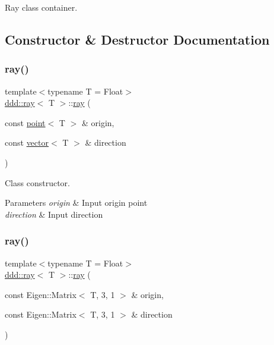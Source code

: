 Ray class container. 

\subsection{Constructor \& Destructor Documentation}
\mbox{\label{classddd_1_1ray_acac10719a90ebaa930a55f2aff5dd372}} 
\subsubsection{\texorpdfstring{ray()}{ray()}\hspace{0.1cm}{\footnotesize\ttfamily [1/2]}}
{\footnotesize\ttfamily template$<$typename T = Float$>$ \\
\hyperlink{classddd_1_1ray}{ddd\+::ray}$<$ T $>$\+::\hyperlink{classddd_1_1ray}{ray} (\begin{DoxyParamCaption}\item[{const \hyperlink{classddd_1_1point}{point}$<$ T $>$ \&}]{origin,  }\item[{const \hyperlink{classddd_1_1vector}{vector}$<$ T $>$ \&}]{direction }\end{DoxyParamCaption})\hspace{0.3cm}{\ttfamily [inline]}}



Class constructor. 


\begin{DoxyParams}{Parameters}
{\em origin} & Input origin point \\
\hline
{\em direction} & Input direction \\
\hline
\end{DoxyParams}
\mbox{\label{classddd_1_1ray_a7dda924f93114bf913684c0241637f7d}} 
\subsubsection{\texorpdfstring{ray()}{ray()}\hspace{0.1cm}{\footnotesize\ttfamily [2/2]}}
{\footnotesize\ttfamily template$<$typename T = Float$>$ \\
\hyperlink{classddd_1_1ray}{ddd\+::ray}$<$ T $>$\+::\hyperlink{classddd_1_1ray}{ray} (\begin{DoxyParamCaption}\item[{const Eigen\+::\+Matrix$<$ T, 3, 1 $>$ \&}]{origin,  }\item[{const Eigen\+::\+Matrix$<$ T, 3, 1 $>$ \&}]{direction }\end{DoxyParamCaption})\hspace{0.3cm}{\ttfamily [inline]}}



